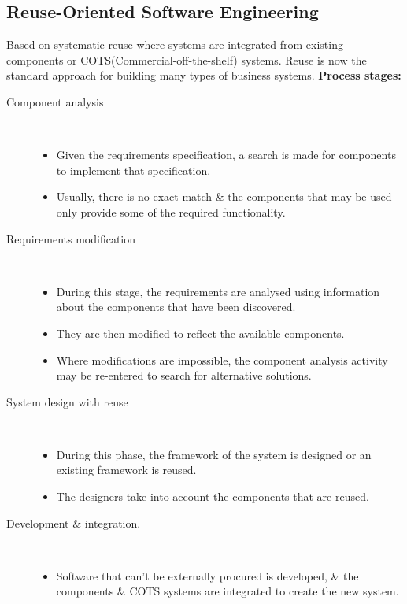 \documentclass{report}
\begin{document}
\subsection{Reuse-Oriented Software Engineering}
Based on systematic reuse where systems are integrated from existing components or COTS(Commercial-off-the-shelf) systems. Reuse is now the standard approach for building many types of business systems.\newline
\textbf{Process stages:}
\begin{description}
  \item [Component analysis] \
  \begin{itemize}
    \item Given the requirements specification, a search is made for components to implement that specification.
    \item Usually, there is no exact match \& the components that may be used only provide some of the required functionality.
  \end{itemize}
  \item[Requirements modification] \
  \begin{itemize}
  \item During this stage, the requirements are analysed using information about the components that have been discovered.
  \item They are then modified to reflect the available components.
  \item Where modifications are impossible, the component analysis activity may be re-entered to search for alternative solutions.
  \end{itemize}
  \item [System design with reuse] \
  \begin{itemize}
  \item During this phase, the framework of the system is designed or an existing framework is reused.
  \item The designers take into account the components that are reused.
  \end{itemize}
  \item [Development \& integration.] \
  \begin{itemize}
   \item Software that can’t be externally procured is developed, \& the components \& COTS systems are integrated to create the new system.
  \end{itemize}
\end{description}
\end{document}
